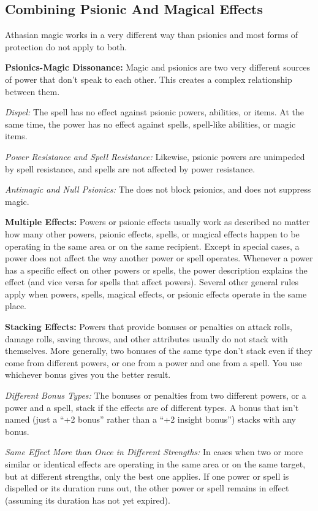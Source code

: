 \subsection{Combining Psionic And Magical Effects}
Athasian magic works in a very different way than psionics and most forms of protection do not apply to both.

\textbf{Psionics-Magic Dissonance:} Magic and psionics are two very different sources of power that don't speak to each other. This creates a complex relationship between them.

\textit{Dispel:} The  spell has no effect against psionic powers, abilities, or items. At the same time, the  power has no effect against spells, spell-like abilities, or magic items.

\textit{Power Resistance and Spell Resistance:} Likewise, psionic powers are unimpeded by spell resistance, and spells are not affected by power resistance.

\textit{Antimagic and Null Psionics:} The  does not block psionics, and  does not suppress magic.

\textbf{Multiple Effects:} Powers or psionic effects usually work as described no matter how many other powers, psionic effects, spells, or magical effects happen to be operating in the same area or on the same recipient. Except in special cases, a power does not affect the way another power or spell operates. Whenever a power has a specific effect on other powers or spells, the power description explains the effect (and vice versa for spells that affect powers). Several other general rules apply when powers, spells, magical effects, or psionic effects operate in the same place.

\textbf{Stacking Effects:} Powers that provide bonuses or penalties on attack rolls, damage rolls, saving throws, and other attributes usually do not stack with themselves. More generally, two bonuses of the same type don't stack even if they come from different powers, or one from a power and one from a spell. You use whichever bonus gives you the better result.

\textit{Different Bonus Types:} The bonuses or penalties from two different powers, or a power and a spell, stack if the effects are of different types. A bonus that isn't named (just a ``+2 bonus'' rather than a ``+2 insight bonus'') stacks with any bonus.

\textit{Same Effect More than Once in Different Strengths:} In cases when two or more similar or identical effects are operating in the same area or on the same target, but at different strengths, only the best one applies. If one power or spell is dispelled or its duration runs out, the other power or spell remains in effect (assuming its duration has not yet expired).

